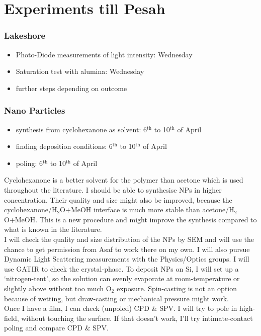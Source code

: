 \documentclass[a4paper,10pt]{article}
\begin{document}
\part*{Experiments till Pesah}
\section*{Lakeshore}
\begin{itemize}
	\item Photo-Diode measurements of light intensity: Wednesday
	\item Saturation test with alumina: Wednesday
	\item further steps depending on outcome
\end{itemize}
\section*{Nano Particles}
\begin{itemize}
	\item synthesis from cyclohexanone as solvent: 6$^{\text{th}}$ to 10$^{\text{th}}$ of April
	\item finding deposition conditions: 6$^{\text{th}}$ to 10$^{\text{th}}$ of April
	\item poling: 6$^{\text{th}}$ to 10$^{\text{th}}$ of April
\end{itemize}
Cyclohexanone is a better solvent for the polymer than acetone which is used throughout the literature. I should be able to synthesise NPs in higher concentration. Their quality and size might also be improved, because the cyclohexanone/H$_2$O+MeOH interface is much more stable than acetone/H$_2$O+MeOH. This is a new procedure and might improve the synthesis compared to what is known in the literature.\\
I will check the quality and size distribution of the NPs by SEM and will use the chance to get permission from Asaf to work  there on my own. I will also pursue Dynamic Light Scattering measurements with the Physics/Optics groups. I will use GATIR to check the crystal-phase. To deposit NPs on Si, I will set up a  \lq{}nitrogen-tent\rq{}, so the solution can evenly evaporate at room-temperature or slightly above without too much O$_2$ exposure. Spin-casting is not an option because of wetting, but draw-casting or mechanical pressure might work.\\ 
Once I have a film, I can check (unpoled) CPD \& SPV. I will try to pole in high-field, without touching the surface. If that doesn\rq{}t work, I\rq{}ll try intimate-contact poling and compare CPD \& SPV.
\end{document}
